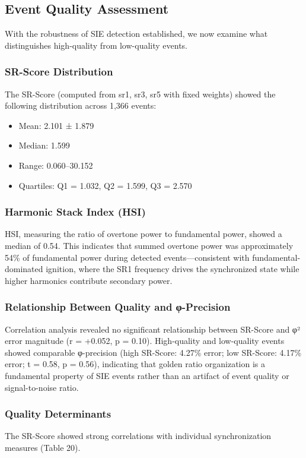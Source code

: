 \documentclass[11pt,a4paper]{article}
\begin{document}
\subsection{Event Quality Assessment}
With the robustness of SIE detection established, we now examine what distinguishes high-quality from low-quality events.

\subsubsection{SR-Score Distribution}
The SR-Score (computed from sr1, sr3, sr5 with fixed weights) showed the following distribution across 1,366 events:
\begin{itemize}
\item Mean: 2.101 ± 1.879
\item Median: 1.599
\item Range: 0.060–30.152
\item Quartiles: Q1 = 1.032, Q2 = 1.599, Q3 = 2.570
\end{itemize}

\subsubsection{Harmonic Stack Index (HSI)}
HSI, measuring the ratio of overtone power to fundamental power, showed a median of 0.54. This indicates that summed overtone power was approximately 54\% of fundamental power during detected events—consistent with fundamental-dominated ignition, where the SR1 frequency drives the synchronized state while higher harmonics contribute secondary power.

\subsubsection{Relationship Between Quality and φ-Precision}
Correlation analysis revealed no significant relationship between SR-Score and φ² error magnitude (r = +0.052, p = 0.10). High-quality and low-quality events showed comparable φ-precision (high SR-Score: 4.27\% error; low SR-Score: 4.17\% error; t = 0.58, p = 0.56), indicating that golden ratio organization is a fundamental property of SIE events rather than an artifact of event quality or signal-to-noise ratio.

\subsubsection{Quality Determinants}
The SR-Score showed strong correlations with individual synchronization measures (Table 20).
\end{document}
